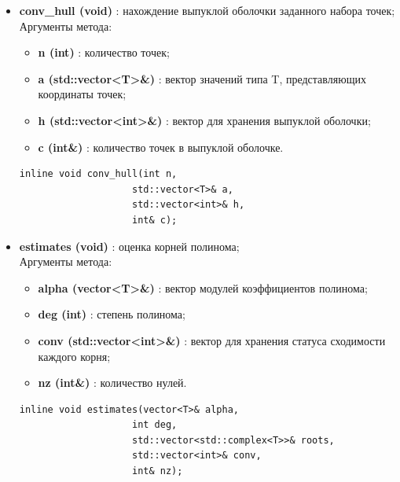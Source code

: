 \documentclass[a4paper,12pt]{article}
\begin{document}
\begin{itemize}
    \item \textbf{conv\_hull (void)} : нахождение выпуклой оболочки заданного набора точек;
    \\Аргументы метода:
    \begin{itemize}
        \renewcommand{\labelitemi}{-}
        \item \textbf{n (int)} : количество точек;
        \item \textbf{a (std::vector<T>\&)} : вектор значений типа T, представляющих координаты точек;
        \item \textbf{h (std::vector<int>\&)} : вектор для хранения выпуклой оболочки;
        \item \textbf{c (int\&)} : количество точек в выпуклой оболочке.
    \end{itemize}
    \begin{lstlisting}[language=С++]
inline void conv_hull(int n, 
                    std::vector<T>& a, 
                    std::vector<int>& h, 
                    int& c); \end{lstlisting}

    \item \textbf{estimates (void)} : оценка корней полинома;
    \\Аргументы метода:
    \begin{itemize}
        \renewcommand{\labelitemi}{-}
        \item \textbf{alpha (vector<T>\&)} : вектор модулей коэффициентов полинома;
        \item \textbf{deg (int)} : степень полинома;
        \item \textbf{conv (std::vector<int>\&)} : вектор для хранения статуса сходимости каждого корня;
        \item \textbf{nz (int\&)} : количество нулей.
    \end{itemize}
    \begin{lstlisting}[language=С++]
inline void estimates(vector<T>& alpha, 
                    int deg, 
                    std::vector<std::complex<T>>& roots, 
                    std::vector<int>& conv, 
                    int& nz); \end{lstlisting}


\end{itemize}
\end{document}
